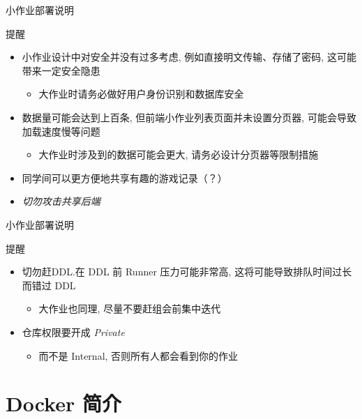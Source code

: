 \documentclass{beamer}
\begin{document}
\begin{frame}{小作业部署说明}
    \begin{block}{提醒}
        \begin{itemize}
            \item 小作业设计中对安全并没有过多考虑, 例如直接明文传输、存储了密码, 这可能带来一定安全隐患
            \begin{itemize}
                \item 大作业时请务必做好用户身份识别和数据库安全
            \end{itemize}
            \item 数据量可能会达到上百条, 但前端小作业列表页面并未设置分页器, 可能会导致加载速度慢等问题
            \begin{itemize}
                \item 大作业时涉及到的数据可能会更大, 请务必设计分页器等限制措施
            \end{itemize}
            \item  同学间可以更方便地共享有趣的游戏记录（？）
            \item \emph{切勿攻击共享后端}
        \end{itemize}
    \end{block}
\end{frame}

\begin{frame}{小作业部署说明}
    \begin{block}{提醒}
        \begin{itemize}
            \item 切勿赶DDL.在 DDL 前 Runner 压力可能非常高, 这将可能导致排队时间过长而错过 DDL
            \begin{itemize}
                \item 大作业也同理, 尽量不要赶组会前集中迭代
            \end{itemize}
            \item 仓库权限要开成 \emph{Private}
            \begin{itemize}
                \item 而不是 Internal, 否则所有人都会看到你的作业
            \end{itemize}
        \end{itemize}
    \end{block}
\end{frame}

\section{Docker 简介}
\end{document}
